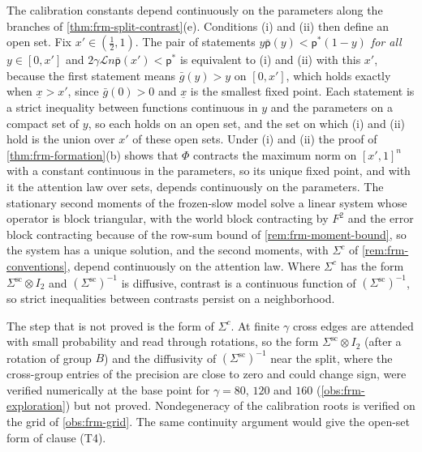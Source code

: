 The calibration constants depend continuously on the parameters along the branches of \cref{thm:frm-split-contrast}(e). Conditions (i) and (ii) then define an open set. Fix $x'\in(\frac12,1)$. The pair of statements \emph{$y\bar{\mathsf p}(y)<\mathsf p^\ast(1-y)$ for all $y\in[0,x']$} and \emph{$2\gamma\mathcal Ln\bar{\mathsf p}(x')<\mathsf p^\ast$} is equivalent to (i) and (ii) with this $x'$, because the first statement means $\bar g(y)>y$ on $[0,x']$, which holds exactly when $\underline x>x'$, since $\bar g(0)>0$ and $\underline x$ is the smallest fixed point. Each statement is a strict inequality between functions continuous in $y$ and the parameters on a compact set of $y$, so each holds on an open set, and the set on which (i) and (ii) hold is the union over $x'$ of these open sets. Under (i) and (ii) the proof of \cref{thm:frm-formation}(b) shows that $\Phi$ contracts the maximum norm on $[x',1]^n$ with a constant continuous in the parameters, so its unique fixed point, and with it the attention law over sets, depends continuously on the parameters. The stationary second moments of the frozen-slow model solve a linear system whose operator is block triangular, with the world block contracting by $F^2$ and the error block contracting because of the row-sum bound of \cref{rem:frm-moment-bound}, so the system has a unique solution, and the second moments, with $\Sigma^c$ of \cref{rem:frm-conventions}, depend continuously on the attention law. Where $\Sigma^c$ has the form $\Sigma^{\mathrm{sc}}\otimes I_2$ and $(\Sigma^{\mathrm{sc}})^{-1}$ is diffusive, contrast is a continuous function of $(\Sigma^{\mathrm{sc}})^{-1}$, so strict inequalities between contrasts persist on a neighborhood.

The step that is not proved is the form of $\Sigma^c$. At finite $\gamma$ cross edges are attended with small probability and read through rotations, so the form $\Sigma^{\mathrm{sc}}\otimes I_2$ (after a rotation of group $B$) and the diffusivity of $(\Sigma^{\mathrm{sc}})^{-1}$ near the split, where the cross-group entries of the precision are close to zero and could change sign, were verified numerically at the base point for $\gamma=80$, $120$ and $160$ (\cref{obs:frm-exploration}) but not proved. Nondegeneracy of the calibration roots is verified on the grid of \cref{obs:frm-grid}. The same continuity argument would give the open-set form of clause (T4).

